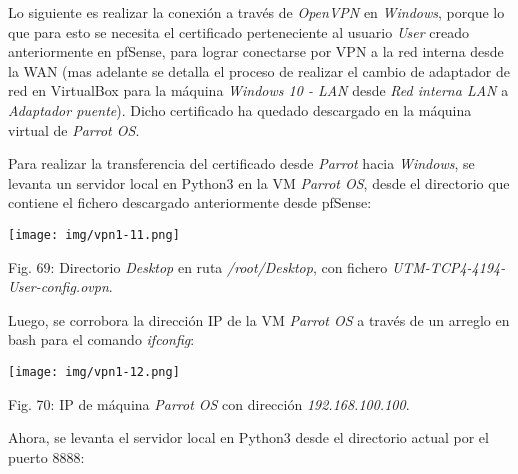 \documentclass[12pt,oneside,a4paper]{book}
\begin{document}
\hspace{20pt}
Lo siguiente es realizar la conexión a través de \textit{OpenVPN} en \textit{Windows}, porque lo que para esto se necesita el certificado perteneciente al usuario \textit{User} creado anteriormente en pfSense, para lograr conectarse por VPN a la red interna desde la WAN (mas adelante se detalla el proceso de realizar el cambio de adaptador de red en VirtualBox para la máquina \textit{Windows 10 - LAN} desde \textit{Red interna LAN} a \textit{Adaptador puente}). Dicho certificado ha quedado descargado en la máquina virtual de \textit{Parrot OS}.

\vspace{1em}

\hspace{20pt}
Para realizar la transferencia del certificado desde \textit{Parrot} hacia \textit{Windows}, se levanta un servidor local en Python3 en la VM \textit{Parrot OS}, desde el directorio que contiene el fichero descargado anteriormente desde pfSense:

\vspace{2em}

\begin{center}
    \texttt{[image: img/vpn1-11.png]}
    
\vspace{0.1em}
    
    Fig. 69: Directorio \textit{Desktop} en ruta \textit{/root/Desktop}, con fichero \textit{UTM-TCP4-4194-User-config.ovpn}.
\end{center}

\vspace{2em}

\hspace{20pt}
Luego, se corrobora la dirección IP de la VM \textit{Parrot OS} a través de un arreglo en bash para el comando \textit{ifconfig}:

\newpage

\begin{center}
    \texttt{[image: img/vpn1-12.png]}
    
\vspace{0.1em}
    
    Fig. 70: IP de máquina \textit{Parrot OS} con dirección \textit{192.168.100.100}.
\end{center}

\vspace{2em}

\hspace{20pt}
Ahora, se levanta el servidor local en Python3 desde el directorio actual por el puerto 8888:
\end{document}
